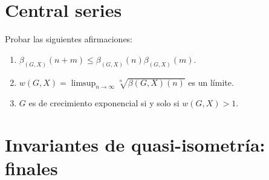 \documentclass[twoside]{article}
\begin{document}
\newpage

\section{Central series}

\begin{ejercicio}{2.1}

\end{ejercicio}
\begin{solucion}

\end{solucion}

\newpage

\begin{ejercicio}{2.2}
 
\end{ejercicio}
\begin{solucion}

\end{solucion}

\newpage

\begin{ejercicio}{2.3}
Probar las siguientes afirmaciones:
\begin{enumerate}
\item $\beta_{(G,X)}(n+m)\leq \beta_{(G,X)}(n)\beta_{(G,X)}(m)$.
\item $w(G,X)=\limsup_{n\to \infty}\sqrt[n]{\beta(G,X)(n)}$ es un límite. 
\item $G$ es de crecimiento exponencial si y solo si $w(G,X)>1$.
\end{enumerate}
\end{ejercicio}
\begin{solucion}

\end{solucion}

\newpage

\begin{ejercicio}{2.4}

\end{ejercicio}
\begin{solucion}

\end{solucion}

\newpage

\section{Invariantes de quasi-isometría: finales}
\end{document}

